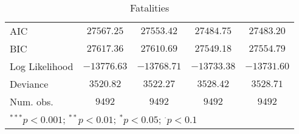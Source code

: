 \begin{sidewaystable}
\begin{center}
{\begin{tabular}{l c c c c}
\midrule
AIC                                      & $27567.25$    & $27553.42$    & $27484.75$    & $27483.20$      \\
BIC                                      & $27617.36$    & $27610.69$    & $27549.18$    & $27554.79$      \\
Log Likelihood                           & $-13776.63$   & $-13768.71$   & $-13733.38$   & $-13731.60$     \\
Deviance                                 & $3520.82$     & $3522.27$     & $3528.42$     & $3528.71$       \\
Num. obs.                                & $9492$        & $9492$        & $9492$        & $9492$          \\
\bottomrule
\multicolumn{5}{l}{\scriptsize{$^{***}p<0.001$; $^{**}p<0.01$; $^{*}p<0.05$; $^{\cdot}p<0.1$}}
\end{tabular}
}
\caption{Fatalities}
\label{statebaseddeaths}
\end{center}
\end{sidewaystable}
